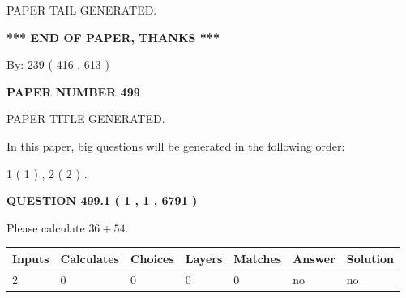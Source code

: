 \documentclass[12pt]{article}
\begin{document}
   
   
   
   
   
 \vspace{0.2in}
 
   
   
\vspace{2.0in} PAPER TAIL GENERATED.
   
   
   
   
\vspace{1.0in} 
{\textbf{\large{ *** END OF PAPER, THANKS *** }}} 
   
   
\hspace{1.0in} By: 
 239 ( 416 ,  613 )
   
   
   
   
\newpage 
\setcounter{page}{ 
   499001 } 
   
   
   
   
 {\textbf{ \Large{ PAPER NUMBER  499  }}}
   
   
\vspace{0.2in}
   
   
   
   
   
   
   
   
 \vspace{0.2in}
 
 
 
 
   
   
 PAPER TITLE GENERATED.
   
   
   
\vspace{0.2in}
   
In this paper, big questions will be generated in the following order: 
   
   
   1 ( 1 )
 ,
   2 ( 2 )
 .
  
\vspace{0.2in}
  
{\textbf{\Large{QUESTION
499.1 
 ( 1 , 1 , 6791 )
}}}
  
  
 
Please calculate $ %
36 +  %
54 $.
 
 
   
   
   
   
\noindent\begin{tabular}{|l|l|l|l|l|l|l|}
 \hline
Inputs & Calculates & Choices & Layers & Matches & Answer & Solution \\ \hline
 2  & 
 0  & 
 0
  & 
 0  & 
 0  & 
  no & 
  no 
  \\ \hline
 \end{tabular}
   
\end{document}
